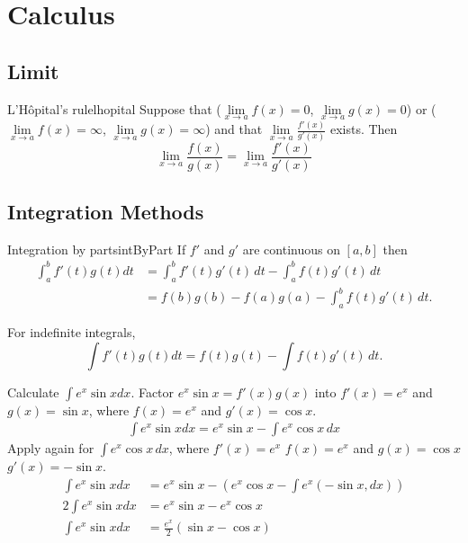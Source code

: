 \section{Calculus}
\subsection{Limit}
\begin{fact}{L'Hôpital's rule}{lhopital}
  Suppose that ($\lim\limits_{x\rightarrow a}f(x)=0$, $\lim\limits_{x\rightarrow a}g(x)=0$) or ($\lim\limits_{x\rightarrow a}f(x)=\infty$, $\lim\limits_{x\rightarrow a}g(x)=\infty$) and that $\lim\limits_{x\rightarrow a}\frac{f'(x)}{g'(x)}$ exists.
  Then
  \[
   \lim\limits_{x\rightarrow a}\frac{f(x)}{g(x)} = \lim\limits_{x\rightarrow a}\frac{f'(x)}{g'(x)}
  \]
\end{fact}

\subsection{Integration Methods}
\begin{fact}{Integration by parts}{intByPart}
  If $f'$ and $g'$ are continuous on $[a,b]$ then
\begin{align*}
   \int_{a}^{b} f'(t)g(t) dt & = \int_{a}^{b} f'(t)g'(t)\,dt - \int_{a}^{b} f(t)g'(t)\,dt\\
                             & = f(b)g(b)-f(a)g(a) - \int_{a}^{b} f(t)g'(t)\,dt.
\end{align*}

For indefinite integrals,
\[
  \int f'(t)g(t) dt = f(t)g(t) - \int f(t)g'(t)\,dt.
\]
\end{fact}

\begin{exec}
  Calculate $\int e^x \sin{x} dx$.
  \tcblower
  Factor $e^x\sin{x} = f'(x)g(x)$ into $f'(x) =e^x$ and $g(x)=\sin{x}$,
  where $f(x)=e^x$ and $g'(x)=\cos{x}$.
  \begin{align*}
    \int e^x \sin{x} dx = e^x \sin{x} - \int e^x \cos{x}\,dx
  \end{align*}
  Apply  again for $\int e^x \cos{x}\,dx$,
  where $f'(x)=e^x$ \g $f(x)=e^x$ and $g(x)=\cos{x}$ \g $g'(x)=-\sin{x}$.
  \begin{align*}
    \int e^x \sin{x} dx &= e^x \sin{x} - (e^x\cos{x}-\int e^x (-\sin{x},dx))\\
    2\int e^x \sin{x} dx &= e^x \sin{x} - e^x\cos{x} \\
    \int e^x \sin{x} dx &= \frac{e^x}{2} \left(\sin{x} - \cos{x}\right)
  \end{align*}
\end{exec}

